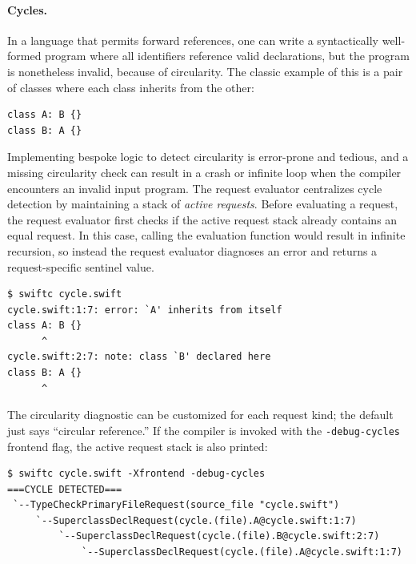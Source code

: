 \documentclass[../generics]{subfiles}
\begin{document}
\paragraph{Cycles.} In a language that permits forward references, one can write a syntactically well-formed program where all identifiers reference valid declarations, but the program is nonetheless invalid, because of circularity. The classic example of this is a pair of classes where each class inherits from the other:
\begin{Verbatim}
class A: B {}
class B: A {}
\end{Verbatim}
Implementing bespoke logic to detect circularity is error-prone and tedious, and a missing circularity check can result in a crash or infinite loop when the compiler encounters an invalid input program. The request evaluator centralizes cycle detection by maintaining a stack of \emph{active requests}. Before evaluating a request, the request evaluator first checks if the active request stack already contains an equal request. In this case, calling the evaluation function would result in infinite recursion, so instead the request evaluator diagnoses an error and returns a request-specific sentinel value.
\begin{Verbatim}
$ swiftc cycle.swift
cycle.swift:1:7: error: `A' inherits from itself
class A: B {}
      ^
cycle.swift:2:7: note: class `B' declared here
class B: A {}
      ^
\end{Verbatim}

The circularity diagnostic can be customized for each request kind; the default just says ``circular reference.'' If the compiler is invoked with the \texttt{-debug-cycles} frontend flag, the active request stack is also printed:
\begin{Verbatim}
$ swiftc cycle.swift -Xfrontend -debug-cycles
===CYCLE DETECTED===
 `--TypeCheckPrimaryFileRequest(source_file "cycle.swift")
     `--SuperclassDeclRequest(cycle.(file).A@cycle.swift:1:7)
         `--SuperclassDeclRequest(cycle.(file).B@cycle.swift:2:7)
             `--SuperclassDeclRequest(cycle.(file).A@cycle.swift:1:7)
\end{Verbatim}
\end{document}
